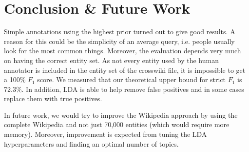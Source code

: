\documentclass[a4paper,10pt,twocolumn]{article}
\begin{document}
\section{Conclusion \& Future Work}
Simple annotations using the highest prior turned out to give good results. A reason for this could be the simplicity of an average query, i.e. people usually look for the most common things. Moreover, the evaluation depends very much on having the correct entity set. As not every entity used by the human annotator is included in the entity set of the crosswiki file, it is impossible to get a 100\% $F_1$ score. We measured that our theoretical upper bound for strict $F_1$ is 72.3\%. In addition, LDA is able to help remove false positives and in some cases replace them with true positives.

In future work, we would try to improve the Wikipedia approach by using the complete Wikipedia and not just 70,000 entities (which would require more memory). Moreover, improvement is expected from tuning the LDA hyperparameters and finding an optimal number of  topics.



\end{document}
